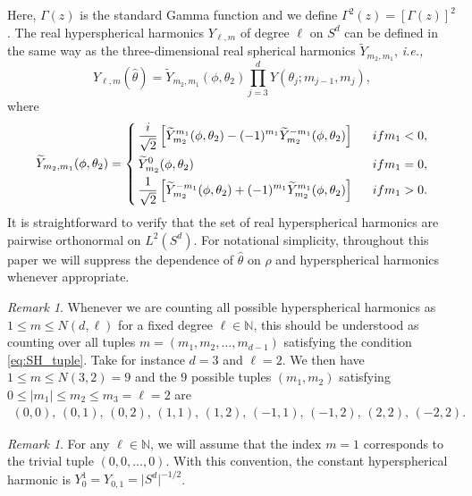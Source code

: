 \documentclass[11pt]{amsart}
\theoremstyle{definition}
\theoremstyle{plain}
\theoremstyle{remark}
\newtheorem{remark}[definition]{Remark}
\newcommand{\N}{\mathbb{N}}
\newcommand{\ie}{{\it{i.e.}, }}
\newcommand{\tn}{\textnormal}
\newcommand{\abs}[1]{\lvert{#1}\rvert}
\begin{document}
Here, $\Gamma(z)$ is the standard Gamma function and we define $\Gamma^2(z) = \left[\Gamma(z)\right]^2$. The real hyperspherical harmonics $Y_{\ell, m}$ of degree $\ell$ on $S^d$ can be defined in the same way as the three-dimensional real spherical harmonics $\widetilde Y_{m_2, m_1}$, \ie  
\begin{equation*} 
Y_{\ell, m}(\hat\theta) = \widetilde Y_{m_2, m_1}(\phi, \theta_2)\prod_{j = 3}^d Y(\theta_j; m_{j - 1}, m_j), 
\end{equation*} 
where 
\begin{equation*} \label{eq:SH_real} 
\widetilde Y_{m_2, m_1}(\phi, \theta_2) = \begin{dcases} 
\, \frac{i}{\sqrt{2}}\left[\widetilde Y_{m_2}^{m_1}(\phi, \theta_2) - (-1)^{m_1}\widetilde Y_{m_2}^{-m_1}(\phi, \theta_2)\right] & \ \ \tn{ if } m_1 < 0, \\ 
\, \widetilde Y_{m_2}^{0}(\phi, \theta_2) & \ \ \tn{ if } m_1 = 0, \\ 
\, \frac{1}{\sqrt{2}}\left[\widetilde Y_{m_2}^{-m_1}(\phi, \theta_2) + (-1)^{m_1}\widetilde Y_{m_2}^{m_1}(\phi, \theta_2)\right] & \ \ \tn{ if } m_1 > 0. 
\end{dcases} 
\end{equation*} 
It is straightforward to verify that the set of real hyperspherical harmonics are pairwise orthonormal on $L^2(S^d)$. For notational simplicity, throughout this paper we will suppress the dependence of $\hat\theta$ on $\rho$ and hyperspherical harmonics whenever appropriate. 


\begin{remark} 
Whenever we are counting all possible hyperspherical harmonics as $1\le m\le N(d, \ell)$ for a fixed degree $\ell\in\N$, this should be understood as counting over all tuples $m = \left(m_1, m_2, \dots, m_{d - 1}\right)$ satisfying the condition \eqref{eq:SH_tuple}. Take for instance $d = 3$ and $\ell = 2$. We then have $1\le m\le N(3, 2) = 9$ and the $9$ possible tuples $(m_1, m_2)$ satisfying $0\le \abs{m_1}\le m_2\le m_3 = \ell = 2$ are 
\begin{align*} 
(0, 0), \, (0, 1), \, (0, 2), \, (1, 1), \, (1, 2), \, (-1, 1), \, (-1, 2), \, (2, 2), \, (-2, 2). 
\end{align*} 
\end{remark} 

\begin{remark} 
For any $\ell\in\N$, we will assume that the index $m = 1$ corresponds to the trivial tuple $(0, 0, \dots, 0)$. With this convention, the constant hyperspherical harmonic is $Y_0^1 = Y_{0, 1} = \abs{S^d}^{-1/2}$. 
\end{remark} 
\end{document}
